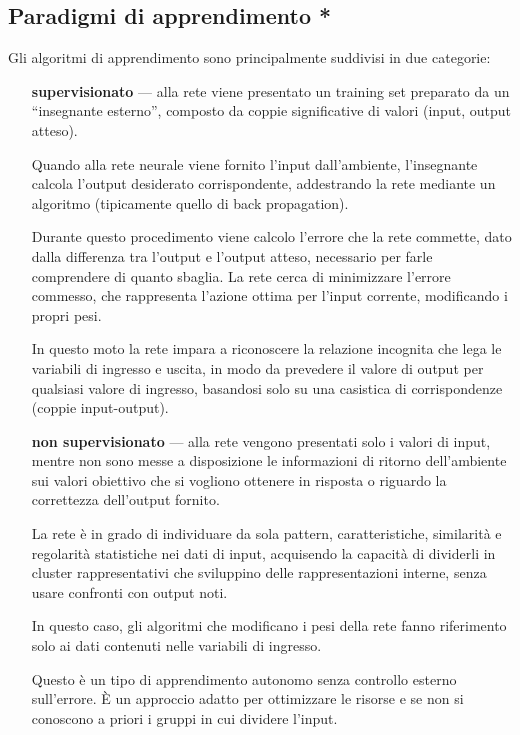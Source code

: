\subsection{Paradigmi di apprendimento *}
\label{subsec:Paradigmi di apprendimento}

Gli algoritmi di apprendimento sono principalmente suddivisi in due categorie:
\begin{itemize}
	\item[\bfseries supervisionato] --- alla rete viene presentato un training set preparato da un ``insegnante esterno'', composto da coppie significative di valori (input, output atteso).
	
	Quando alla rete neurale viene fornito l'input dall'ambiente, l'insegnante calcola l'output desiderato corrispondente, addestrando la rete mediante un algoritmo (tipicamente quello di back propagation). 
	
	{\color{red}Durante questo procedimento viene calcolo l'errore che la rete commette, } dato dalla differenza tra l'output e l'output atteso, necessario per farle comprendere di quanto sbaglia. La rete cerca di minimizzare l'errore commesso, che rappresenta l'azione ottima per l'input corrente, modificando i propri pesi.
	
	In questo moto la rete impara a riconoscere la relazione incognita che lega le variabili di ingresso e uscita, in modo da prevedere il valore di output per qualsiasi valore di ingresso, basandosi solo su una casistica di corrispondenze (coppie input-output).
	
	\item[\bfseries non supervisionato] --- alla rete vengono presentati solo i valori di input, mentre non sono messe a disposizione le informazioni di ritorno dell'ambiente sui valori obiettivo che si vogliono ottenere in risposta o riguardo la correttezza dell'output fornito.
	
	La rete è in grado di individuare da sola pattern, caratteristiche, similarità e regolarità statistiche nei dati di input, acquisendo la capacità di dividerli in cluster rappresentativi che sviluppino delle rappresentazioni interne, senza usare confronti con output noti.
	
	In questo caso, gli algoritmi che modificano i pesi della rete fanno riferimento solo ai dati contenuti nelle variabili di ingresso.
	
	Questo è un tipo di apprendimento autonomo senza controllo esterno sull'errore. È un approccio adatto per ottimizzare le risorse e se non si conoscono a priori i gruppi in cui dividere l'input.
\end{itemize}

